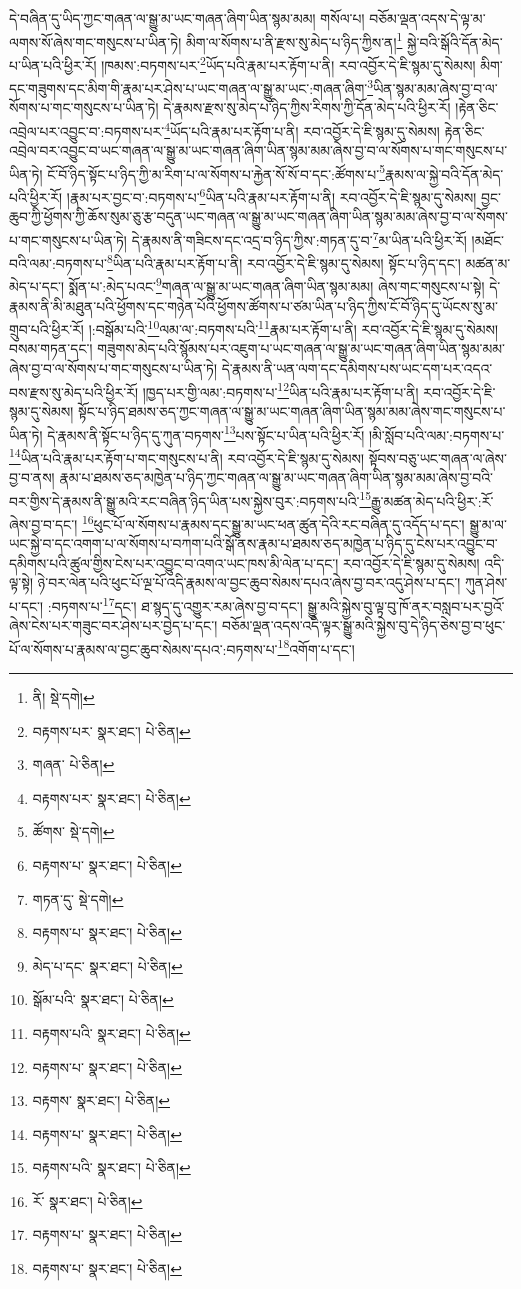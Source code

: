 དེ་བཞིན་དུ་ཡིད་ཀྱང་གཞན་ལ་སྒྱུ་མ་ཡང་གཞན་ཞིག་ཡིན་སྙམ་མམ། གསོལ་པ། བཅོམ་ལྡན་འདས་དེ་ལྟ་མ་ལགས་སོ་ཞེས་གང་གསུངས་པ་ཡིན་ཏེ། མིག་ལ་སོགས་པ་ནི་རྫས་སུ་མེད་པ་ཉིད་ཀྱིས་ན།\footnote{ནི།  སྡེ་དགེ། } སྐྱེ་བའི་སྒོའི་དོན་མེད་པ་ཡིན་པའི་ཕྱིར་རོ། །ཁམས་:བཏགས་པར་\footnote{བརྟགས་པར་  སྣར་ཐང་།  པེ་ཅིན། }ཡོད་པའི་རྣམ་པར་རྟོག་པ་ནི། རབ་འབྱོར་དེ་ཇི་སྙམ་དུ་སེམས། མིག་དང་གཟུགས་དང་མིག་གི་རྣམ་པར་ཤེས་པ་ཡང་གཞན་ལ་སྒྱུ་མ་ཡང་:གཞན་ཞིག་\footnote{གཞན་  པེ་ཅིན། }ཡིན་སྙམ་མམ་ཞེས་བྱ་བ་ལ་སོགས་པ་གང་གསུངས་པ་ཡིན་ཏེ། དེ་རྣམས་རྫས་སུ་མེད་པ་ཉིད་ཀྱིས་རིགས་ཀྱི་དོན་མེད་པའི་ཕྱིར་རོ། །རྟེན་ཅིང་འབྲེལ་པར་འབྱུང་བ་:བཏགས་པར་\footnote{བརྟགས་པར་  སྣར་ཐང་།  པེ་ཅིན། }ཡོད་པའི་རྣམ་པར་རྟོག་པ་ནི། རབ་འབྱོར་དེ་ཇི་སྙམ་དུ་སེམས། རྟེན་ཅིང་འབྲེལ་བར་འབྱུང་བ་ཡང་གཞན་ལ་སྒྱུ་མ་ཡང་གཞན་ཞིག་ཡིན་སྙམ་མམ་ཞེས་བྱ་བ་ལ་སོགས་པ་གང་གསུངས་པ་ཡིན་ཏེ། ངོ་བོ་ཉིད་སྟོང་པ་ཉིད་ཀྱི་མ་རིག་པ་ལ་སོགས་པ་རྐྱེན་སོ་སོ་བ་དང་:ཚོགས་པ་\footnote{ཚོགས་  སྡེ་དགེ། }རྣམས་ལ་སྐྱེ་བའི་དོན་མེད་པའི་ཕྱིར་རོ། །རྣམ་པར་བྱང་བ་:བཏགས་པ་\footnote{བརྟགས་པ་  སྣར་ཐང་།  པེ་ཅིན། }ཡིན་པའི་རྣམ་པར་རྟོག་པ་ནི། རབ་འབྱོར་དེ་ཇི་སྙམ་དུ་སེམས། བྱང་ཆུབ་ཀྱི་ཕྱོགས་ཀྱི་ཆོས་སུམ་ཅུ་རྩ་བདུན་ཡང་གཞན་ལ་སྒྱུ་མ་ཡང་གཞན་ཞིག་ཡིན་སྙམ་མམ་ཞེས་བྱ་བ་ལ་སོགས་པ་གང་གསུངས་པ་ཡིན་ཏེ། དེ་རྣམས་ནི་གཟིངས་དང་འདྲ་བ་ཉིད་ཀྱིས་:གཏན་དུ་བ་\footnote{གཏན་དུ་  སྡེ་དགེ། }མ་ཡིན་པའི་ཕྱིར་རོ། །མཐོང་བའི་ལམ་:བཏགས་པ་\footnote{བརྟགས་པ་  སྣར་ཐང་།  པེ་ཅིན། }ཡིན་པའི་རྣམ་པར་རྟོག་པ་ནི། རབ་འབྱོར་དེ་ཇི་སྙམ་དུ་སེམས། སྟོང་པ་ཉིད་དང་། མཚན་མ་མེད་པ་དང་། སྨོན་པ་:མེད་པའང་\footnote{མེད་པ་དང་  སྣར་ཐང་།  པེ་ཅིན། }གཞན་ལ་སྒྱུ་མ་ཡང་གཞན་ཞིག་ཡིན་སྙམ་མམ། ཞེས་གང་གསུངས་པ་སྟེ། དེ་རྣམས་ནི་མི་མཐུན་པའི་ཕྱོགས་དང་གཉེན་པོའི་ཕྱོགས་ཚོགས་པ་ཙམ་ཡིན་པ་ཉིད་ཀྱིས་ངོ་བོ་ཉིད་དུ་ཡོངས་སུ་མ་གྲུབ་པའི་ཕྱིར་རོ། །:བསྒོམ་པའི་\footnote{སྒོམ་པའི་  སྣར་ཐང་།  པེ་ཅིན། }ལམ་ལ་:བཏགས་པའི་\footnote{བརྟགས་པའི་  སྣར་ཐང་།  པེ་ཅིན། }རྣམ་པར་རྟོག་པ་ནི། རབ་འབྱོར་དེ་ཇི་སྙམ་དུ་སེམས། བསམ་གཏན་དང་། གཟུགས་མེད་པའི་སྙོམས་པར་འཇུག་པ་ཡང་གཞན་ལ་སྒྱུ་མ་ཡང་གཞན་ཞིག་ཡིན་སྙམ་མམ་ཞེས་བྱ་བ་ལ་སོགས་པ་གང་གསུངས་པ་ཡིན་ཏེ། དེ་རྣམས་ནི་ཡན་ལག་དང་དམིགས་པས་ཡང་དག་པར་འདའ་བས་རྫས་སུ་མེད་པའི་ཕྱིར་རོ། །ཁྱད་པར་གྱི་ལམ་:བཏགས་པ་\footnote{བརྟགས་པ་  སྣར་ཐང་།  པེ་ཅིན། }ཡིན་པའི་རྣམ་པར་རྟོག་པ་ནི། རབ་འབྱོར་དེ་ཇི་སྙམ་དུ་སེམས། སྟོང་པ་ཉིད་ཐམས་ཅད་ཀྱང་གཞན་ལ་སྒྱུ་མ་ཡང་གཞན་ཞིག་ཡིན་སྙམ་མམ་ཞེས་གང་གསུངས་པ་ཡིན་ཏེ། དེ་རྣམས་ནི་སྟོང་པ་ཉིད་དུ་ཀུན་བཏགས་\footnote{བརྟགས་  སྣར་ཐང་།  པེ་ཅིན། }པས་སྟོང་པ་ཡིན་པའི་ཕྱིར་རོ། །མི་སློབ་པའི་ལམ་:བཏགས་པ་\footnote{བརྟགས་པ་  སྣར་ཐང་།  པེ་ཅིན། }ཡིན་པའི་རྣམ་པར་རྟོག་པ་གང་གསུངས་པ་ནི། རབ་འབྱོར་དེ་ཇི་སྙམ་དུ་སེམས། སྟོབས་བཅུ་ཡང་གཞན་ལ་ཞེས་བྱ་བ་ནས། རྣམ་པ་ཐམས་ཅད་མཁྱེན་པ་ཉིད་ཀྱང་གཞན་ལ་སྒྱུ་མ་ཡང་གཞན་ཞིག་ཡིན་སྙམ་མམ་ཞེས་བྱ་བའི་བར་གྱིས་དེ་རྣམས་ནི་སྒྱུ་མའི་རང་བཞིན་ཉིད་ཡིན་པས་སྐྱེས་བུར་:བཏགས་པའི་\footnote{བརྟགས་པའི་  སྣར་ཐང་།  པེ་ཅིན། }རྒྱུ་མཚན་མེད་པའི་ཕྱིར་:རོ་ཞེས་བྱ་བ་དང་། \footnote{རོ་  སྣར་ཐང་།  པེ་ཅིན། }ཕུང་པོ་ལ་སོགས་པ་རྣམས་དང་སྒྱུ་མ་ཡང་ཕན་ཚུན་དེའི་རང་བཞིན་དུ་འདོད་པ་དང་། སྒྱུ་མ་ལ་ཡང་སྐྱེ་བ་དང་འགག་པ་ལ་སོགས་པ་བཀག་པའི་སྒོ་ནས་རྣམ་པ་ཐམས་ཅད་མཁྱེན་པ་ཉིད་དུ་ངེས་པར་འབྱུང་བ་དམིགས་པའི་ཚུལ་གྱིས་ངེས་པར་འབྱུང་བ་འགའ་ཡང་ཁས་མི་ལེན་པ་དང་། རབ་འབྱོར་དེ་ཇི་སྙམ་དུ་སེམས། འདི་ལྟ་སྟེ། ཉེ་བར་ལེན་པའི་ཕུང་པོ་ལྔ་པོ་འདི་རྣམས་ལ་བྱང་ཆུབ་སེམས་དཔའ་ཞེས་བྱ་བར་འདུ་ཤེས་པ་དང་། ཀུན་ཤེས་པ་དང་། :བཏགས་པ་\footnote{བརྟགས་པ་  སྣར་ཐང་།  པེ་ཅིན། }དང་། ཐ་སྙད་དུ་འགྱུར་རམ་ཞེས་བྱ་བ་དང་། སྒྱུ་མའི་སྐྱེས་བུ་ལྟ་བུ་ཁོ་ནར་བསླབ་པར་བྱའོ་ཞེས་ངེས་པར་གཟུང་བར་ཤེས་པར་བྱེད་པ་དང་། བཅོམ་ལྡན་འདས་འདི་ལྟར་སྒྱུ་མའི་སྐྱེས་བུ་དེ་ཉིད་ཅེས་བྱ་བ་ཕུང་པོ་ལ་སོགས་པ་རྣམས་ལ་བྱང་ཆུབ་སེམས་དཔའ་:བཏགས་པ་\footnote{བརྟགས་པ་  སྣར་ཐང་།  པེ་ཅིན། }འགོག་པ་དང་། 